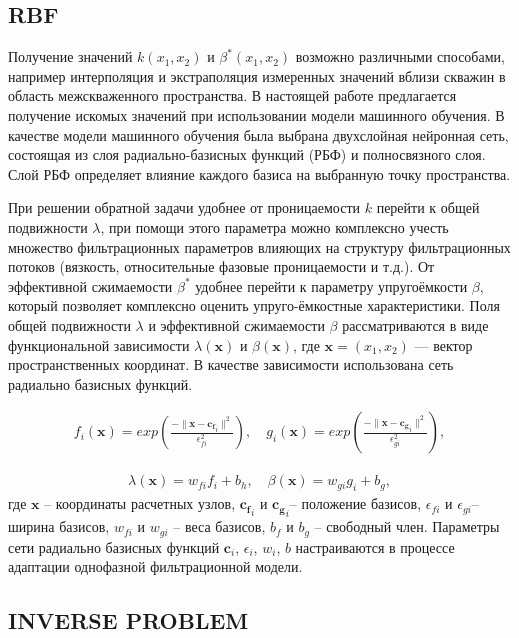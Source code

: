 \documentclass{article}
\begin{document}
\subsection{RBF}

Получение значений $k(x_1,x_2)$ и $\beta^*(x_1,x_2)$ возможно различными способами, например интерполяция и экстраполяция измеренных значений вблизи скважин в область межскваженного пространства. В настоящей работе предлагается получение искомых значений при использовании модели машинного обучения. В качестве модели машинного обучения была выбрана двухслойная нейронная сеть, состоящая из слоя радиально-базисных функций (РБФ) и полносвязного слоя. Слой РБФ определяет влияние каждого базиса на выбранную точку пространства.

При решении обратной задачи удобнее от проницаемости $k$ перейти к общей подвижности $\lambda$, при помощи этого параметра можно комплексно учесть множество фильтрационных параметров влияющих на структуру фильтрационных потоков (вязкость, относительные фазовые проницаемости и т.д.). От эффективной сжимаемости $\beta^*$ удобнее перейти к параметру упругоёмкости $\beta$, который позволяет комплексно оценить упруго-ёмкостные характеристики.
Поля общей подвижности $\lambda$ и эффективной сжимаемости $\beta$ рассматриваются в виде функциональной зависимости $\lambda(\mathbf{x})$ и $\beta(\mathbf{x})$, где  $\mathbf{x} = (x_1, x_2)$ --- вектор пространственных координат. В качестве зависимости использована сеть радиально базисных функций.

\begin{eqnarray}\label{rbf}
	f_i(\mathbf{x}) = exp \left(\frac{-\lVert \mathbf{x} - \mathbf{c_f}_i \rVert^2}{\epsilon_{fi}^2}\right), \quad
	g_i(\mathbf{x}) = exp \left(\frac{-\lVert \mathbf{x} - \mathbf{c_g}_i \rVert^2}{\epsilon_{gi}^2}\right),
\end{eqnarray}

\begin{eqnarray}
	\lambda(\mathbf{x}) = w_{fi}f_i + b_h, \quad
	\beta(\mathbf{x}) = w_{gi}g_i + b_g,
\end{eqnarray}
где $\mathbf{x}$ – координаты расчетных узлов,  $\mathbf{c_f}_i$ и $\mathbf{c_g}_i$– положение базисов, $\epsilon_{fi}$ и $\epsilon_{gi}$– ширина базисов, $w_{fi}$ и $w_{gi}$ – веса базисов, $b_f$ и $b_g$ – свободный член. Параметры сети радиально базисных функций $\mathbf{c}_i$, $\epsilon_i$, $w_i$, $b$  настраиваются в процессе адаптации однофазной фильтрационной модели.

\subsection{INVERSE PROBLEM}
\end{document}
